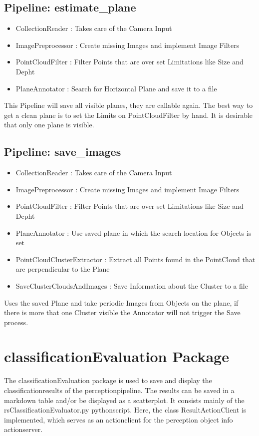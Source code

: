 \documentclass[main.tex]{subfiles}
\begin{document}
			\subsection{Pipeline: estimate\_plane}
\begin{itemize}
	\item CollectionReader : Takes care of the Camera  Input
	\item ImagePreprocessor : Create missing Images and implement Image Filters  
	\item PointCloudFilter : Filter Points that are over set Limitations like Size and Depht
	\item PlaneAnnotator : Search for Horizontal Plane and save it to a file 
\end{itemize}
This Pipeline will save all visible planes, they are callable again. The best way to get a clean plane is to set the Limits on PointCloudFilter by hand. It is desirable that only one plane is visible. 

			\subsection{Pipeline: save\_images}
\begin{itemize}
	\item CollectionReader : Takes care of the Camera  Input
	\item ImagePreprocessor : Create missing Images and implement Image Filters  
	\item PointCloudFilter : Filter Points that are over set Limitations like Size and Depht
	\item PlaneAnnotator : Use saved plane in which the search location for Objects is set
	\item PointCloudClusterExtractor : Extract all Points found in the PointCloud that are perpendicular to the Plane 
	\item SaveClusterCloudsAndImages : Save Information about the Cluster to a file 
\end{itemize}
Uses the saved Plane and take periodic Images from Objects on the plane, if there is more that one Cluster visible the Annotator will not trigger the Save process.

\section{classificationEvaluation Package}

The classificationEvaluation package is used to save and display the classificationresults of the perceptionpipeline. The results can be saved in a markdown table and/or be displayed as a scatterplot. It consists mainly of the rsClassificationEvaluator.py pythonscript. Here, the class ResultActionClient is implemented, which serves as an actionclient for the perception object info actionserver.\\
\end{document}
